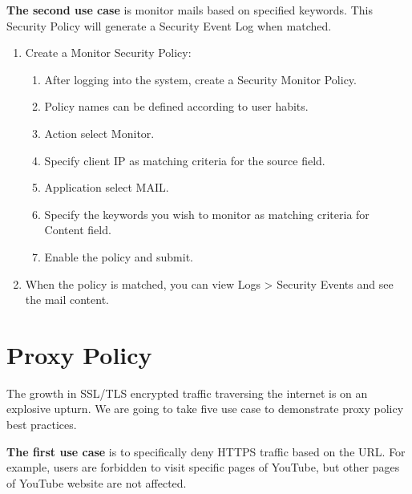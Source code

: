 \textbf{The second use case} is monitor mails based on specified keywords. This Security Policy will generate a Security Event Log when matched.

\begin{description}[leftmargin=0pt,itemindent=0em]
    \item[] 
    \begin{enumerate}
        \item	Create a Monitor Security Policy:
        \begin{enumerate}
            \item	After logging into the system, create a Security Monitor Policy.
            \item	Policy names can be defined according to user habits.
            \item	Action select Monitor.
            \item	Specify client IP as matching criteria for the source field. 
            \item	Application select MAIL.
            \item	Specify the keywords you wish to monitor as matching criteria for Content field.  
            \item	Enable the policy and submit.
        \end{enumerate}        
        \item	When the policy is matched, you can view Logs > Security Events and see the mail content.
    \end{enumerate}	
\end{description}

\section*{\hypertarget{link:Appendix Proxy Policy}{Proxy Policy}}
\label{sec:appendix_f:proxy}

The growth in SSL/TLS encrypted traffic traversing the internet is on an explosive upturn. We are going to take five use case to demonstrate proxy policy best practices. 


\textbf{The first use case} is to specifically deny HTTPS traffic based on the URL. For example, users are forbidden to visit specific pages of YouTube, but other pages of YouTube website are not affected.

